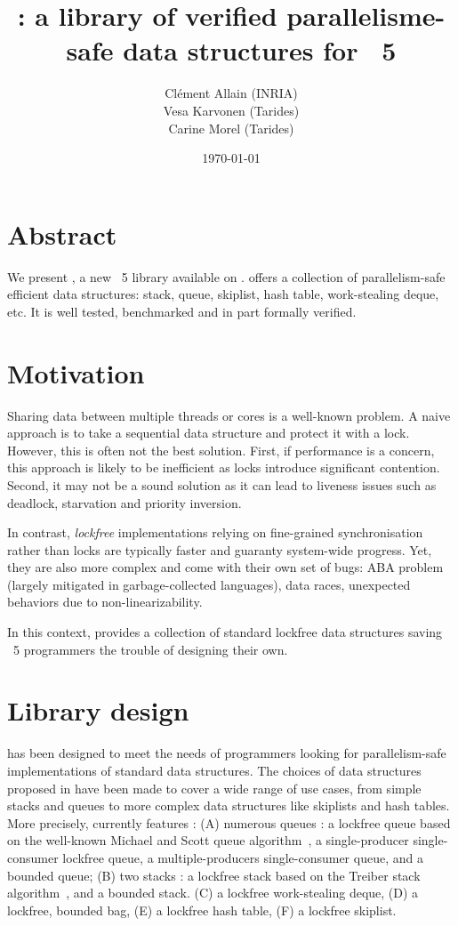 \documentclass[a4paper, 11pt]{article}
\title{\Saturn: a library of verified parallelisme-safe data structures for \OCaml~5}
\date{\today}
\author{
  Clément Allain (INRIA) \\
  Vesa Karvonen (Tarides) \\
  Carine Morel (Tarides)
}
\begin{document}
\maketitle

\section{Abstract}

We present \Saturn, a new \OCaml~5 library available on \opam.
\Saturn offers a collection of parallelism-safe efficient data structures: stack, queue, skiplist, hash table, work-stealing deque, etc.
It is well tested, benchmarked and in part formally verified.

\section{Motivation}

Sharing data between multiple threads or cores is a well-known problem.
A naive approach is to take a sequential data structure and protect it with a lock.
However, this is often not the best solution.
First, if performance is a concern, this approach is likely to be inefficient as locks introduce significant contention.
Second, it may not be a sound solution as it can lead to liveness issues such as deadlock, starvation and priority inversion.

In contrast, \emph{lockfree} implementations relying on fine-grained synchronisation rather than locks are typically faster and guaranty system-wide progress.
Yet, they are also more complex and come with their own set of bugs: ABA problem (largely mitigated in garbage-collected languages), data races, unexpected behaviors due to non-linearizability.

In this context, \Saturn provides a collection of standard lockfree data structures saving \OCaml~5 programmers the trouble of designing their own.

\section{Library design}

\Saturn has been designed to meet the needs of programmers looking for parallelism-safe implementations of standard data structures. The choices of data structures proposed in have been made to cover a wide range of use cases, from simple stacks and queues to more complex data structures like skiplists and hash tables.  More precisely, \Saturn currently features : 
(A) numerous queues : a lockfree queue based on the well-known Michael and Scott queue algorithm~\cite{michael1996simple}, a single-producer single-consumer lockfree queue, a multiple-producers single-consumer queue, and a bounded queue; 
(B) two stacks : a lockfree stack based on the Treiber stack algorithm~\cite{treiber1986systems}, and a bounded stack. %
(C) a lockfree work-stealing deque,
(D) a lockfree, bounded bag,
(E) a lockfree hash table, 
(F) a lockfree skiplist.
\end{document}
